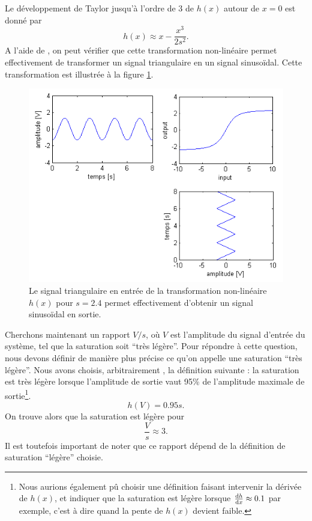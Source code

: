Le développement de Taylor jusqu'à l'ordre de 3 de
$h(x)$ autour de $x=0$ est donné par 
\[ h(x) \approx x-\frac{x^3}{2s^2}. \]
A l'aide de \matlab, on peut vérifier que cette
transformation non-linéaire permet effectivement
de transformer un signal triangulaire en un signal
sinusoïdal. Cette transformation est illustrée à
la figure \ref{fig:in_out_diagram}.

\begin{figure}[ht]
	\centering
	\includegraphics[scale=0.6]{img/in_out_diagram.png}
	\caption{Le signal triangulaire en entrée de la transformation
	non-linéaire $h(x)$ pour $s=2.4$ permet effectivement d'obtenir
	un signal sinusoïdal en sortie.}
	\label{fig:in_out_diagram}
\end{figure}

Cherchons maintenant un rapport $V/s$, où $V$ est
l'amplitude du signal d'entrée du système, tel que
la saturation soit ``très légère''. Pour répondre à cette question,
nous devons définir de manière plus précise ce qu'on appelle
une saturation ``très légère''. Nous avons choisis, arbitrairement
, la définition suivante : la saturation est très légère
lorsque l'amplitude de sortie vaut 95\% de l'amplitude
maximale de sortie\footnote{Nous aurions également pû choisir une définition
faisant intervenir la dérivée de $h(x)$, et indiquer que la
saturation est légère lorsque $\frac{\operatorname{d}\! h}{\operatorname{d}\! x} \approx 0.1$ par exemple,
c'est à dire quand la pente de $h(x)$ devient faible.}.
\[ h(V) = 0.95s. \]
On trouve alors que la saturation est légère pour 
\[ \frac{V}{s} \approx 3. \]
Il est toutefois important de noter que ce rapport
dépend de la définition de saturation ``légère'' choisie.


